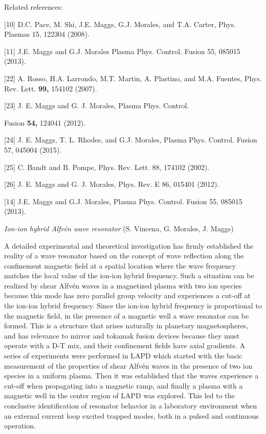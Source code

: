 \documentclass[11pt]{article}
\begin{document}
\begin{description}
Related references:

{[}10{]} D.C. Pace, M. Shi, J.E. Maggs, G.J. Morales, and T.A. Carter,
Phys. Plasmas 15, 122304 (2008).

{[}11{]} J.E. Maggs and G.J. Morales Plasma Phys. Control. Fusion 55,
085015 (2013).

{[}22{]} A. Rosso, H.A. Larrondo, M.T. Martin, A. Plastino, and M.A.
Fuentes, Phys. Rev. Lett. \textbf{99,} 154102 (2007).

{[}23{]} J. E. Maggs and G. J. Morales, Plasma Phys. Control.

Fusion \textbf{54,} 124041 (2012).

{[}24{]} J. E. Maggs, T. L. Rhodes, and G.J. Morales, Plasma Phys.
Control. Fusion 57, 045004 (2015).

{[}25{]} C. Bandt and B. Pompe, Phys. Rev. Lett. 88, 174102 (2002).

{[}26{]} J. E. Maggs and G. J. Morales, Phys. Rev. E 86, 015401 (2012).

{[}14{]} J.E. Maggs and G.J. Morales, Plasma Phys. Control. Fusion 55,
085015 (2013).

\emph{Ion-ion hybrid Alfvén wave resonator} (S. Vincena, G. Morales, J.
Maggs)

A detailed experimental and theoretical investigation has firmly
established the reality of a wave resonator based on the concept of wave
reflection along the confinement magnetic field at a spatial location
where the wave frequency matches the local value of the ion-ion hybrid
frequency. Such a situation can be realized by shear Alfvén waves in a
magnetized plasma with two ion species because this mode has zero
parallel group velocity and experiences a cut-off at the ion-ion hybrid
frequency. Since the ion-ion hybrid frequency is proportional to the
magnetic field, in the presence of a magnetic well a wave resonator can
be formed. This is a structure that arises naturally in planetary
magnetospheres, and has relevance to mirror and tokamak fusion devices
because they must operate with a D-T mix, and their confinement fields
have axial gradients. A series of experiments were performed in LAPD
which started with the basic measurement of the properties of shear
Alfvén waves in the presence of two ion species in a uniform plasma.
Then it was established that the waves experience a cut-off when
propagating into a magnetic ramp, and finally a plasma with a magnetic
well in the center region of LAPD was explored. This led to the
conclusive identification of resonator behavior in a laboratory
environment when an external current loop excited trapped modes, both in
a pulsed and continuous operation.


\end{description}
\end{document}
